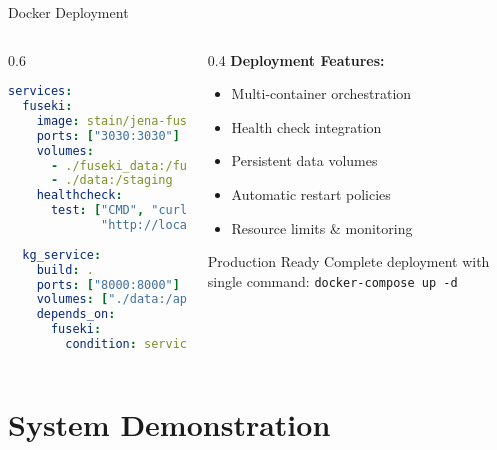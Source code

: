 \documentclass[aspectratio=169]{beamer}
\begin{document}
\begin{frame}[fragile]{Docker Deployment}
    \begin{columns}[c]
        \begin{column}{0.6\textwidth}
            \begin{lstlisting}[language=yaml]
services:
  fuseki:
    image: stain/jena-fuseki:latest
    ports: ["3030:3030"]
    volumes:
      - ./fuseki_data:/fuseki
      - ./data:/staging
    healthcheck:
      test: ["CMD", "curl", "-f", 
             "http://localhost:3030/$/ping"]
      
  kg_service:
    build: .
    ports: ["8000:8000"]
    volumes: ["./data:/app/data"]
    depends_on:
      fuseki:
        condition: service_healthy
            \end{lstlisting}
        \end{column}
        \begin{column}{0.4\textwidth}
            \textbf{Deployment Features:}
            \begin{itemize}
                \item Multi-container orchestration
                \item Health check integration
                \item Persistent data volumes
                \item Automatic restart policies
                \item Resource limits \& monitoring
            \end{itemize}
            
            \vspace{0.3cm}
            
            \begin{alertblock}{Production Ready}
                Complete deployment with single command: \texttt{docker-compose up -d}
            \end{alertblock}
        \end{column}
    \end{columns}
\end{frame}

\section{System Demonstration}
\end{document}
